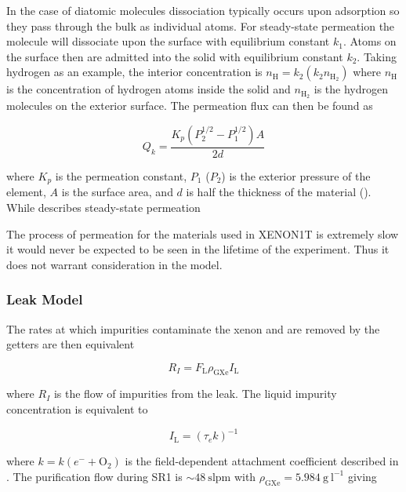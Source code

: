In the case of diatomic molecules dissociation typically occurs
upon adsorption so they pass through the bulk as individual atoms.  For steady-state permeation the molecule will dissociate upon the
surface with equilibrium constant $k_1$.  Atoms on the surface then are admitted into the solid with equilibrium constant $k_2$.  Taking
hydrogen as an example, the
interior concentration is $n_{\mathrm{H}} = k_2 (k_2 n_{\mathrm{H_2}})$ where $n_{\mathrm{H}}$ is the concentration of hydrogen atoms
inside the solid and $n_{\mathrm{H_2}}$ is the hydrogen molecules on the exterior surface.  The permeation flux can then be found as

\begin{equation}
Q_k = \frac{K_p (P_2^{1/2} - P_1^{1/2})A}{2d}
\label{eq:electron_lifetime_model_outgassing_leak_sources_perm}
\end{equation}

\noindent where $K_p$ is the permeation constant, $P_1$ ($P_2$) is the exterior pressure of the element, $A$ is the surface area, and
$d$ is half the thickness of the material ().  While 
describes steady-state permeation 

The process of permeation for the materials used in XENON1T is extremely slow it would never be expected to be seen in the lifetime of the
experiment.  Thus it does not warrant consideration in the model.



\subsubsection{Leak Model}
\label{subsubsec:electron_lifetime_model_outgassing_leak_model}
The rates at which impurities
contaminate the xenon and are removed by the getters are then equivalent

\begin{equation}
R_I = F_{\mathrm{L}} \rho_{\mathrm{GXe}} I_{\mathrm{L}}
\end{equation}

\noindent where $R_I$ is the flow of impurities from the leak.  The liquid impurity concentration is equivalent to

\begin{equation}
I_{\mathrm{L}} = ( \tau_e k)^{-1}
\end{equation}

\noindent where $k = k(e^- + \mathrm{O_2})$ is the field-dependent \electron attachment coefficient described in
.  The purification flow during SR1 is ${\sim} 48\ \mathrm{slpm}$ with
$\rho_{\mathrm{GXe}} = 5.984\ \mathrm{g\ l^{-1}}$ giving

